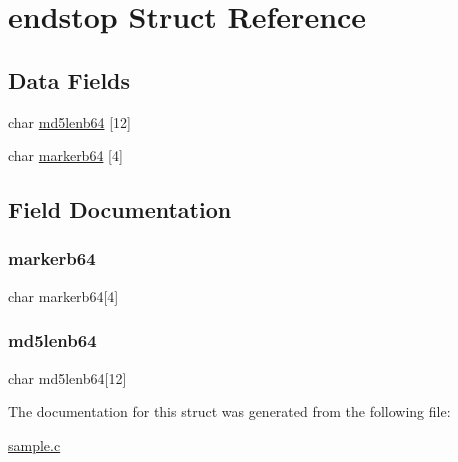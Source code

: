 \hypertarget{structendstop}{}\section{endstop Struct Reference}
\label{structendstop}
\subsection*{Data Fields}
\begin{DoxyCompactItemize}
\item 
char \mbox{\hyperlink{structendstop_ae5f29c2e1b08176f604e6a4255147883}{md5lenb64}} \mbox{[}12\mbox{]}
\item 
char \mbox{\hyperlink{structendstop_a45d0b3c1f88901a3d92d905bd044672d}{markerb64}} \mbox{[}4\mbox{]}
\end{DoxyCompactItemize}


\subsection{Field Documentation}
\mbox{\label{structendstop_a45d0b3c1f88901a3d92d905bd044672d}} 
\subsubsection{\texorpdfstring{markerb64}{markerb64}}
{\footnotesize\ttfamily char markerb64\mbox{[}4\mbox{]}}

\mbox{\label{structendstop_ae5f29c2e1b08176f604e6a4255147883}} 
\subsubsection{\texorpdfstring{md5lenb64}{md5lenb64}}
{\footnotesize\ttfamily char md5lenb64\mbox{[}12\mbox{]}}



The documentation for this struct was generated from the following file\+:\begin{DoxyCompactItemize}
\item 
\mbox{\hyperlink{sample_8c}{sample.\+c}}\end{DoxyCompactItemize}
